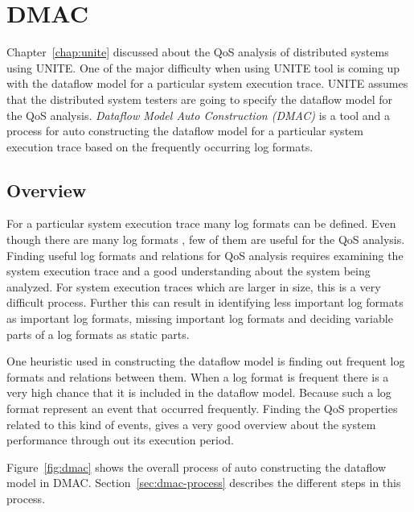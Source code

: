 \chapter{DMAC}
\label{chap:dmac}

Chapter~\ref{chap:unite} discussed about the QoS analysis of 
distributed systems using UNITE. One of the major difficulty when 
using UNITE tool is coming up with the dataflow model for a 
particular system execution trace. UNITE assumes that the distributed 
system testers are going to specify the dataflow model for the QoS 
analysis. \textit{Dataflow Model Auto Construction (DMAC)} is a tool and 
a process for auto constructing the dataflow model for a particular 
system execution trace based on the frequently occurring log formats.

\section{Overview}
\label{sec:dmac-overview}

For a particular system execution trace many log formats can be defined. 
Even though there are many log formats , few of them are useful for the 
QoS analysis. Finding useful log formats and relations for QoS analysis 
requires examining the system execution trace and a good understanding 
about the system being analyzed. For system execution traces which are 
larger in size, this is a very difficult process.
Further this can result in identifying less important log formats as 
important log formats, missing important log formats and deciding variable 
parts of a log formats as static parts.

One heuristic used in constructing the dataflow model is finding out frequent 
log formats and relations between them. When a log format is frequent there 
is a very high chance that it is included in the dataflow model. Because 
such a log format represent an event that occurred frequently. Finding the 
QoS properties related to this kind of events, gives a very good overview 
about the system performance through out its execution period. 

Figure~\ref{fig:dmac} shows the overall process of auto constructing the 
dataflow model in DMAC. Section~\ref{sec:dmac-process} describes the different 
steps in this process.

